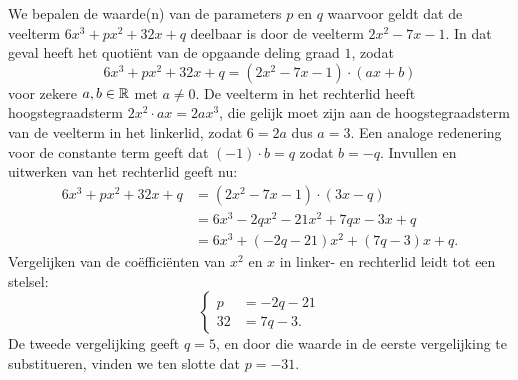 \documentclass{ximera}
\begin{document}
\begin{example} 
We bepalen de waarde(n) van de parameters \(p\) en \(q\) waarvoor geldt dat de veelterm \(6x^3+px^2+32x+q\) deelbaar is door de veelterm \(2x^2-7x-1\). In dat geval heeft het quotiënt van de opgaande deling graad \(1\), zodat 
\[
6x^3+px^2+32x+q = (2x^2-7x-1)\cdot (ax+b)
\]
voor zekere \(a,b \in \mathbb{R}\) met \(a \neq 0\). De veelterm in het rechterlid heeft hoogstegraadsterm \(2x^2 \cdot ax = 2ax^3\), die gelijk moet zijn aan de hoogstegraadsterm van de veelterm in het linkerlid, zodat \(6 = 2a\) dus \(a = 3\). Een analoge redenering voor de constante term geeft dat \((-1) \cdot b = q\) zodat \(b = -q\). Invullen en uitwerken van het rechterlid geeft nu:
\begin{align*}
6x^3+px^2+32x+q 
& = (2x^2-7x-1)\cdot (3x-q) \\
& = 6x^3 - 2qx^2 - 21x^2 + 7qx - 3x + q \\
& = 6x^3 + (-2q-21)x^2 + (7q-3)x+q.
\end{align*}
Vergelijken van de coëfficiënten van \(x^2\) en \(x\) in linker- en rechterlid leidt tot een stelsel:
\[
\left\{ 
\begin{aligned}
p & = -2q - 21 \\
32 & = 7q - 3. 
\end{aligned}
\right.
\]
De tweede vergelijking geeft \(q = 5\), en door die waarde in de eerste vergelijking te substitueren, vinden we ten slotte dat \(p = -31\).  
\end{example} 
\end{document}
